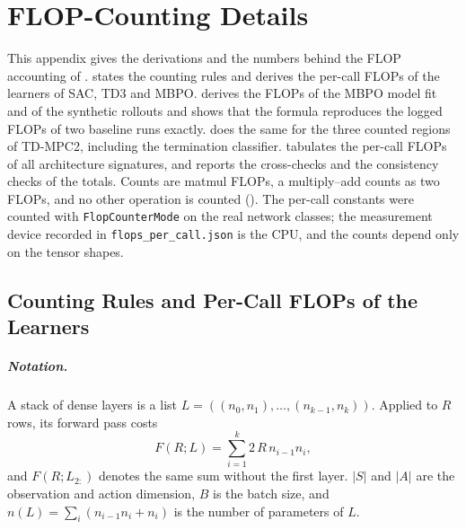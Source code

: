 \chapter{FLOP-Counting Details}
\label{app:flop-details}

This appendix gives the derivations and the numbers behind the FLOP accounting of .
 states the counting rules and derives the per-call FLOPs of the learners of SAC, TD3 and MBPO.
 derives the FLOPs of the MBPO model fit and of the synthetic rollouts and shows that the formula reproduces the logged FLOPs of two baseline runs exactly.
 does the same for the three counted regions of TD-MPC2, including the termination classifier.
 tabulates the per-call FLOPs of all architecture signatures, and  reports the cross-checks and the consistency checks of the totals.
Counts are matmul FLOPs, a multiply--add counts as two FLOPs, and no other operation is counted ().
The per-call constants were counted with \texttt{FlopCounterMode} on the real network classes; the measurement device recorded in \texttt{flops\_per\_call.json} is the CPU, and the counts depend only on the tensor shapes.

\section{Counting Rules and Per-Call FLOPs of the Learners}\label{sec:app-flop-rules}

\paragraph{Notation.} A stack of dense layers is a list $L=((n_0,n_1),\dots,(n_{k-1},n_k))$.
Applied to $R$ rows, its forward pass costs
\begin{equation}
  F(R;L) = \sum_{i=1}^{k} 2\,R\,n_{i-1}n_i ,
  \label{eq:app-fwd}
\end{equation}
and $F(R;L_{2:})$ denotes the same sum without the first layer.
$|S|$ and $|A|$ are the observation and action dimension, $B$ is the batch size, and $n(L)=\sum_i (n_{i-1}n_i+n_i)$ is the number of parameters of $L$.

